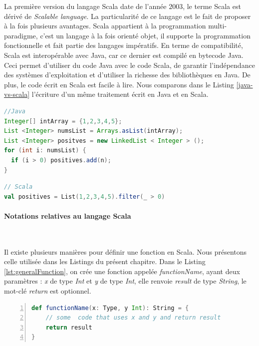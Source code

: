 La première version du langage Scala date de l'année $2003$, le terme  Scala  est dérivé de \textit{Scalable language}. 
La particularité de ce langage est le fait de proposer à la fois plusieurs avantages. Scala appartient à la 
programmation multi-paradigme, c'est  un langage à la fois orienté objet, il supporte la programmation fonctionnelle et fait partie des langages impératifs. En terme de compatibilité, Scala est interopérable avec  Java, car ce dernier est compilé en bytecode Java. Ceci permet d'utiliser du code Java avec le code Scala, de garantir l'indépendance des systèmes d'exploitation et d'utiliser la richesse des bibliothèques en Java. De plus, le code écrit en Scala est facile à lire.
Nous comparons dans le Listing \ref{java-vs-scala} l'écriture d'un même traitement écrit en Java et en Scala.
\begin{center}
	\begin{minipage}[t]{.50\textwidth}
\begin{lstlisting}[language=java, basicstyle=\small]
//Java
Integer[] intArray = {1,2,3,4,5};
List <Integer> numsList = Arrays.asList(intArray);
List <Integer> positves = new LinkedList < Integer > ();
for (int i: numsList) {
  if (i > 0) positives.add(n);
}
\end{lstlisting}
	\end{minipage}\hfill
	\begin{minipage}[t]{.49\textwidth}
\begin{lstlisting}[language=scala, basicstyle=\small]
// Scala 
val positives = List(1,2,3,4,5).filter(_ > 0)
\end{lstlisting}
	\end{minipage}
	\label{java-vs-scala}
\end{center}

\paragraph{Notations relatives au langage Scala}~

Il existe plusieurs manières pour définir une fonction en Scala. Nous présentons celle utilisée dans les Listings du présent chapitre. Dans le Listing \ref{lst:generalFunction}, on crée une fonction appelée  \textit{functionName}, ayant deux paramètres : \textit{x} de type \textit{Int} et \textit{y} de type \textit{Int}, elle renvoie \textit{result} de type \textit{String}, le mot-clé \textit{return} est optionnel.  
\begin{lstlisting}[language=scala,firstnumber=1, caption={Exemple d'une fonction en  Scala}, label={lst:generalFunction}, basicstyle = \footnotesize,escapechar=|,numbers=left,
stepnumber=1,numberstyle=\scriptsize]
def functionName(x: Type, y Int): String = {
	// some  code that uses x and y and return result
	return result 
}
\end{lstlisting} \par

